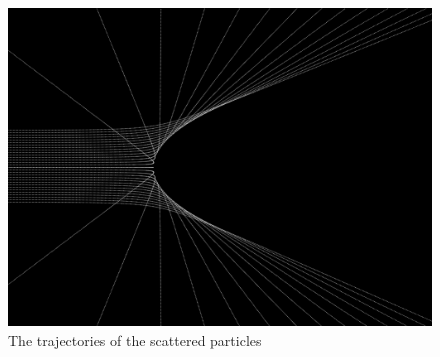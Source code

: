\documentclass[12pt]{article}
\begin{document}
\begin{figure}[h]
  \centering
  \includegraphics[width=0.8\linewidth]{scatter.png}
  \caption{The trajectories of the scattered particles}
  \label{fig:scatter}
\end{figure}
\end{document}
